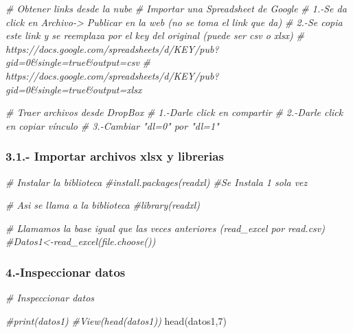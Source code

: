 \documentclass[
]{article}
\newenvironment{Shaded}{\begin{snugshade}}{\end{snugshade}}
\newcommand{\CommentTok}[1]{\textcolor[rgb]{0.56,0.35,0.01}{\textit{#1}}}
\newcommand{\DecValTok}[1]{\textcolor[rgb]{0.00,0.00,0.81}{#1}}
\newcommand{\FunctionTok}[1]{\textcolor[rgb]{0.00,0.00,0.00}{#1}}
\newcommand{\NormalTok}[1]{#1}
\begin{document}
\begin{Shaded}
\begin{Highlighting}[]
\CommentTok{\# Obtener links desde la nube}
\CommentTok{\# Importar una Spreadsheet de Google}
\CommentTok{\# 1.{-}Se da click en Archivo{-}\textgreater{} Publicar en la web (no se toma el link que da)}
\CommentTok{\# 2.{-}Se copia este link y se reemplaza por el key del original (puede ser csv o xlsx)}
\CommentTok{\# https://docs.google.com/spreadsheets/d/KEY/pub?gid=0\&single=true\&output=csv}
\CommentTok{\# https://docs.google.com/spreadsheets/d/KEY/pub?gid=0\&single=true\&output=xlsx}


\CommentTok{\# Traer archivos desde DropBox}
\CommentTok{\# 1.{-}Darle click en compartir}
\CommentTok{\# 2.{-}Darle click en copiar vínculo}
\CommentTok{\# 3.{-}Cambiar "dl=0" por "dl=1"}
\end{Highlighting}
\end{Shaded}

\hypertarget{importar-archivos-xlsx-y-librerias}{%
\subsubsection{\texorpdfstring{3.1.- Importar archivos xlsx y librerias
}{3.1.- Importar archivos xlsx y librerias  }}\label{importar-archivos-xlsx-y-librerias}}

\begin{Shaded}
\begin{Highlighting}[]
\CommentTok{\# Instalar la biblioteca}
\CommentTok{\#install.packages(\textquotesingle{}readxl\textquotesingle{}) \#Se Instala 1 sola vez}

\CommentTok{\# Asi se llama a la biblioteca}
\CommentTok{\#library(readxl)}

\CommentTok{\# Llamamos la base igual que las veces anteriores (read\_excel por read.csv)}
\CommentTok{\#Datos1\textless{}{-}read\_excel(file.choose())}
\end{Highlighting}
\end{Shaded}

\hypertarget{inspeccionar-datos}{%
\subsubsection{\texorpdfstring{4.-Inspeccionar datos
}{4.-Inspeccionar datos  }}\label{inspeccionar-datos}}

\begin{Shaded}
\begin{Highlighting}[]
\CommentTok{\# Inspeccionar datos}

\CommentTok{\#print(datos1)}
\CommentTok{\#View(head(datos1))}
\FunctionTok{head}\NormalTok{(datos1,}\DecValTok{7}\NormalTok{)}
\end{Highlighting}
\end{Shaded}
\end{document}

